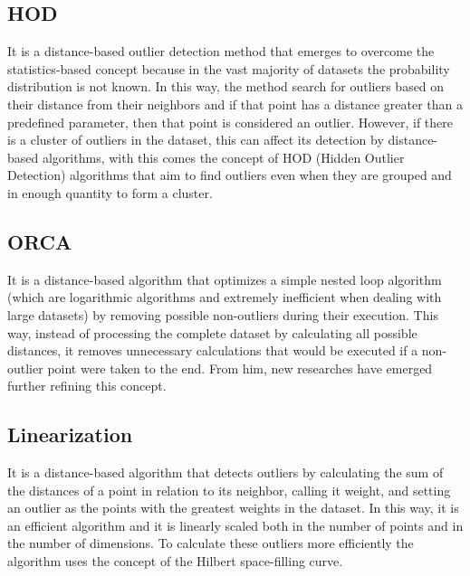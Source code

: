 \subsection{HOD}

It is a distance-based outlier detection method \cite{Xu2016} that emerges to overcome the statistics-based
concept because in the vast majority of datasets the probability distribution is not known.
In this way, the method search for outliers based on their distance from their neighbors
and if that point has a distance greater than a predefined parameter, then that point is
considered an outlier. However, if there is a cluster of outliers in the dataset, this
can affect its detection by distance-based algorithms, with this comes the concept of HOD
(Hidden Outlier Detection) algorithms that aim to find outliers even when they are grouped
and in enough quantity to form a cluster.



\subsection{ORCA}

It is a distance-based algorithm \cite{Bay:2003:MDO:956750.956758} that optimizes a simple nested loop algorithm (which are logarithmic algorithms and extremely inefficient when dealing with large datasets) by removing possible non-outliers during their execution. This way, instead of processing the complete dataset by calculating all possible distances, it removes unnecessary calculations that would be executed if a non-outlier point were taken to the end. From him, new researches have emerged further refining this concept.

\subsection{Linearization}

It is a distance-based algorithm \cite{10.1007/3-540-45681-3_2} that detects outliers by calculating the sum of the distances
of a point in relation to its neighbor, calling it weight, and setting an outlier as the points
with the greatest weights in the dataset. In this way, it is an efficient algorithm and it is
linearly scaled both in the number of points and in the number of dimensions. To calculate these
outliers more efficiently the algorithm uses the concept of the Hilbert space-filling curve.

